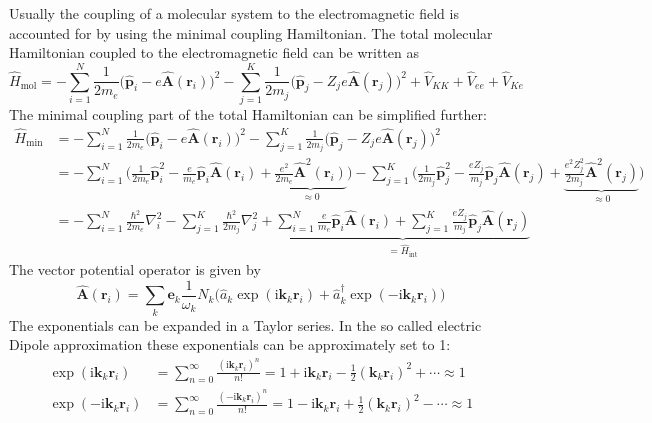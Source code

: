 \documentclass[9pt]{report}
\begin{document}
Usually the coupling of a molecular system to the electromagnetic field is accounted for by using the minimal coupling Hamiltonian. The total molecular Hamiltonian coupled to the electromagnetic field can be written as
\begin{equation}
\hat{H}_{\mathrm{mol}} = -\sum_{i=1}^{N}\frac{1}{2m_{e}}\big(\hat{\boldsymbol{p}}_{i}-e\hat{\boldsymbol{A}}(\boldsymbol{r}_{i})\big)^{2} - \sum_{j=1}^{K}\frac{1}{2m_{j}}\big(\hat{\boldsymbol{p}}_{j}-Z_{j}e\hat{\boldsymbol{A}}(\boldsymbol{r}_{j})\big)^{2} +\hat{V}_{KK}+\hat{V}_{ee}+\hat{V}_{Ke}
\end{equation}
The minimal coupling part of the total Hamiltonian can be simplified further:
\begin{align}
\hat{H}_{\mathrm{min}} &= -\sum_{i=1}^{N}\frac{1}{2m_{e}}\big(\hat{\boldsymbol{p}}_{i}-e\hat{\boldsymbol{A}}(\boldsymbol{r}_{i})\big)^{2} - \sum_{j=1}^{K}\frac{1}{2m_{j}}\big(\hat{\boldsymbol{p}}_{j}-Z_{j}e\hat{\boldsymbol{A}}(\boldsymbol{r}_{j})\big)^{2}\\
&= -\sum_{i=1}^{N}\Big(\frac{1}{2m_e}\hat{\boldsymbol{p}}_{i}^{2}-\frac{e}{m_e}\hat{\boldsymbol{p}}_{i}\hat{\boldsymbol{A}}(\boldsymbol{r}_i)+\underbrace{\frac{e^2}{2m_e}\hat{\boldsymbol{A}}^2(\boldsymbol{r}_i)}_{\approx 0}\Big) -\sum_{j=1}^{K}\Big(\frac{1}{2m_{j}}\hat{\boldsymbol{p}}_{j}^{2}-\frac{eZ_{j}}{m_j}\hat{\boldsymbol{p}}_{j}\hat{\boldsymbol{A}}(\boldsymbol{r}_j)+\underbrace{\frac{e^{2}Z_{j}^2}{2m_j}\hat{\boldsymbol{A}}^2(\boldsymbol{r}_j)}_{\approx 0}\Big)\\
&= -\sum_{i=1}^{N}\frac{\hbar^2}{2m_e}\nabla_{i}^{2}-\sum_{j=1}^{K}\frac{\hbar^2}{2m_{j}}\nabla_{j}^{2}+\underbrace{\sum_{i=1}^{N}\frac{e}{m_e}\hat{\boldsymbol{p}}_{i}\hat{\boldsymbol{A}}(\boldsymbol{r}_{i})+\sum_{j=1}^{K}\frac{eZ_{j}}{m_{j}}\hat{\boldsymbol{p}}_{j}\hat{\boldsymbol{A}}(\boldsymbol{r}_{j})}_{=\hat{H}_{\mathrm{int}}}
\end{align}
The vector potential operator is given by
\begin{equation}
\hat{\boldsymbol{A}}(\boldsymbol{r}_i)=\sum_{k}\boldsymbol{e}_{k}\frac{1}{\omega_k}N_{k}\Big(\hat{a}_{k}\exp(\mathrm{i}\boldsymbol{k}_{k}\boldsymbol{r}_i)+\hat{a}_{k}^{\dagger}\exp(-\mathrm{i}\boldsymbol{k}_{k}\boldsymbol{r}_i)\Big)
\end{equation}
The exponentials can be expanded in a Taylor series. In the so called electric Dipole approximation these exponentials can be approximately set to 1:
\begin{align}
\exp(\mathrm{i}\boldsymbol{k}_{k}\boldsymbol{r}_{i})&=\sum_{n=0}^{\infty}\frac{(\mathrm{i}\boldsymbol{k}_{k}\boldsymbol{r}_i)^n}{n!}=1+\mathrm{i}\boldsymbol{k}_{k}\boldsymbol{r}_{i}-\frac{1}{2}(\boldsymbol{k}_{k}\boldsymbol{r}_i)^2+\cdots\approx 1\\
\exp(-\mathrm{i}\boldsymbol{k}_{k}\boldsymbol{r}_{i})&=\sum_{n=0}^{\infty}\frac{(-\mathrm{i}\boldsymbol{k}_{k}\boldsymbol{r}_i)^n}{n!}=1-\mathrm{i}\boldsymbol{k}_{k}\boldsymbol{r}_{i}+\frac{1}{2}(\boldsymbol{k}_{k}\boldsymbol{r}_i)^2-\cdots\approx 1
\end{align}
\end{document}
